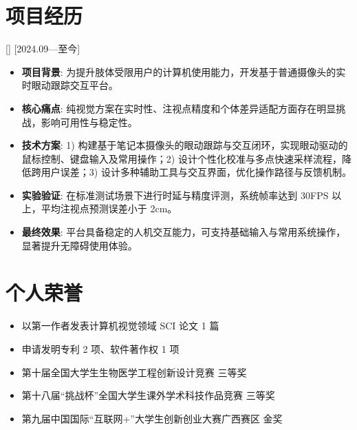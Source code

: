 \documentclass{resume-photo}
\begin{document}
\section{项目经历}

[]
[2024.09—至今]

\begin{itemize}
  \item \textbf{项目背景}: 为提升肢体受限用户的计算机使用能力，开发基于普通摄像头的实时眼动跟踪交互平台。
  \item \textbf{核心痛点}: 纯视觉方案在实时性、注视点精度和个体差异适配方面存在明显挑战，影响可用性与稳定性。
  \item \textbf{技术方案}: 1) 构建基于笔记本摄像头的眼动跟踪与交互闭环，实现眼动驱动的鼠标控制、键盘输入及常用操作；2) 设计个性化校准与多点快速采样流程，降低跨用户误差；3) 设计多种辅助工具与交互界面，优化操作路径与反馈机制。
  \item \textbf{实验验证}: 在标准测试场景下进行时延与精度评测，系统帧率达到 30FPS 以上，平均注视点预测误差小于 2cm。
  \item \textbf{最终效果}: 平台具备稳定的人机交互能力，可支持基础输入与常用系统操作，显著提升无障碍使用体验。
\end{itemize}


\section{个人荣誉}
\begin{itemize}
  \item 以第一作者发表计算机视觉领域 SCI 论文 1 篇
  \item 申请发明专利 2 项、软件著作权 1 项
  \item 第十届全国大学生生物医学工程创新设计竞赛 三等奖
  \item 第十八届“挑战杯”全国大学生课外学术科技作品竞赛 三等奖
  \item 第九届中国国际“互联网+”大学生创新创业大赛广西赛区 金奖
\end{itemize}
\end{document}
